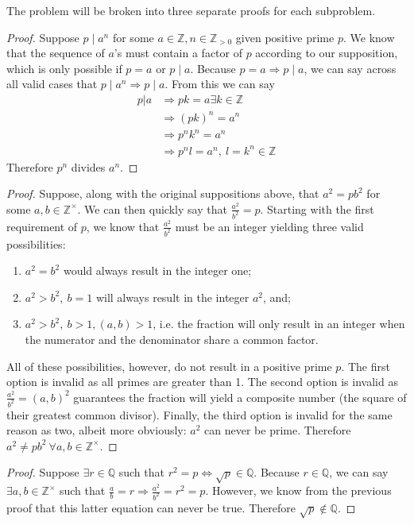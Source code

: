 \documentclass[12pt]{article}
\numberwithin{problem}{section} %
\theoremstyle{remark}  %
\newenvironment{answer}
    {\begin{adjustwidth}{0pt}{0pt}}
    {\end{adjustwidth}}
\begin{document}
    \begin{answer}
        The problem will be broken into three separate proofs for each subproblem.
        \begin{proof}
            Suppose $p\mid a^n$ for some $a\in\mathbb{Z}, n \in \mathbb{Z}_{>0}$ given positive prime $p$. We know that the sequence of $a$'s must contain a factor of $p$ according to our supposition, which is only possible if $p=a$ or $p\mid a$. Because $p=a\Rightarrow p\mid a$, we can say across all valid cases that $p\mid a^n \Rightarrow p\mid a$. From this we can say
            \begin{align*}
                p|a &\Rightarrow pk=a \exists k \in \mathbb{Z} \\
                &\Rightarrow (pk)^n = a^n \\
                &\Rightarrow p^nk^n = a^n \\
                &\Rightarrow p^nl = a^n,\ l=k^n\in \mathbb{Z}
            \end{align*}
            Therefore $p^n$ divides $a^n$.
        \end{proof}
        \begin{proof}
            Suppose, along with the original suppositions above, that $a^2=pb^2$ for some $a,b\in \mathbb{Z}^{\times}$. We can then quickly say that $\frac{a^2}{b^2}=p$. Starting with the first requirement of $p$, we know that $\frac{a^2}{b^2}$ must be an integer yielding three valid possibilities:
            \begin{enumerate}[label=(\roman*)]
                \item $a^2=b^2$ would always result in the integer one;
                \item $a^2>b^2,\ b=1$ will always result in the integer $a^2$, and;
                \item $a^2>b^2,\ b>1, (a,b)>1$, i.e. the fraction will only result in an integer when the numerator and the denominator share a common factor.
            \end{enumerate}
            All of these possibilities, however, do not result in a positive prime $p$. The first option is invalid as all primes are greater than 1. The second option is invalid as $\frac{a^2}{b^2}=(a,b)^2$ guarantees the fraction will yield a composite number (the square of their greatest common divisor). Finally, the third option is invalid for the same reason as two, albeit more obviously: $a^2$ can never be prime. Therefore $a^2\neq pb^2 \ \forall a,b\in\mathbb{Z}^\times$.
        \end{proof}
        \begin{proof}
            Suppose $\exists r\in \mathbb{Q}$ such that $r^2=p \Leftrightarrow \sqrt{p}\in \mathbb{Q}$. Because $r\in\mathbb{Q}$, we can say $\exists a,b\in\mathbb{Z}^\times$ such that $\frac{a}{b}=r \Rightarrow \frac{a^2}{b^2}=r^2=p$. However, we know from the previous proof that this latter equation can never be true. Therefore $\sqrt{p}\notin\mathbb{Q}$.
        \end{proof}
    \end{answer}
\end{document}

